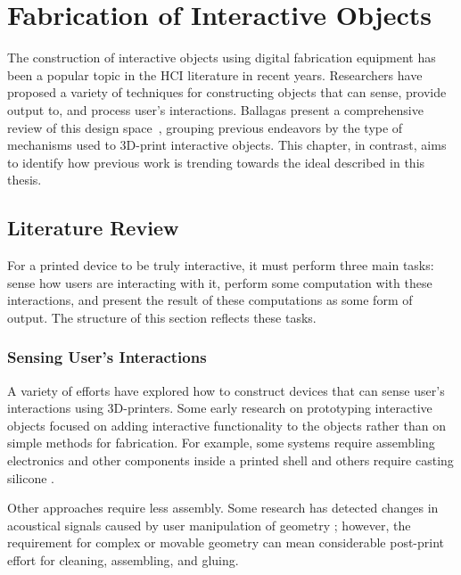 \chapter{Fabrication of Interactive Objects} \label{ch:background}
  The construction of interactive objects using digital fabrication equipment
  has been a popular topic in the HCI literature in recent years. Researchers
  have proposed a variety of techniques for constructing objects that can sense,
  provide output to, and process user's interactions. Ballagas \etal present a
  comprehensive review of this design space~\cite{Ballagas:2018}, grouping
  previous endeavors by the type of mechanisms used to 3D-print interactive
  objects. This chapter, in contrast, aims to identify how previous work is
  trending towards the \pap ideal described in this thesis.

  \section{\papf Literature Review}
    For a printed device to be truly interactive, it must perform three main
    tasks: sense how users are interacting with it, perform some computation
    with these interactions, and present the result of these computations as
    some form of output. The structure of this section reflects these tasks.

    \subsection{Sensing User's Interactions} \label{sec:sensing}
      A variety of efforts have explored how to construct devices that can sense
      user's interactions using 3D-printers. Some early research on prototyping
      interactive objects focused on adding interactive functionality to the
      objects rather than on simple methods for fabrication. For example, some
      systems require assembling electronics and other components inside a
      printed shell \cite{Savage:2015ws, Savage:2013, Murray-Smith:2008,
      Hook:2014kp} and others require casting silicone \cite{He:2017, Rod:2017}.

      Other approaches require less assembly. Some research has detected changes
      in acoustical signals caused by user manipulation of geometry
      \cite{Savage:2015, Laput:2015, Li:2016}; however, the requirement for
      complex or movable geometry can mean considerable post-print effort for
      cleaning, assembling, and gluing.

